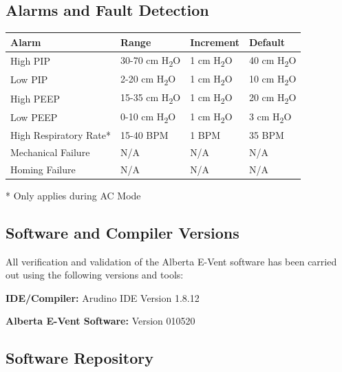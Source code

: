 \documentclass[]{article}
\begin{document}
\subsection{Alarms and Fault Detection}

\begin{center}
	
	\begin{table}[h]
		

	\begin{tabular}{ |p{4.3cm}| p{3cm}| p{3cm}|p{3cm}|}
		\hline
		\textbf{Alarm} & \textbf{Range} & \textbf{Increment} & \textbf{Default}\\
		\hline
		High PIP & 30-70 cm H\textsubscript{2}O & 1 cm H\textsubscript{2}O & 40 cm H\textsubscript{2}O\\
		\hline
		Low PIP & 2-20 cm H\textsubscript{2}O & 1 cm H\textsubscript{2}O & 10 cm H\textsubscript{2}O\\
		\hline
		High PEEP & 15-35 cm H\textsubscript{2}O & 1 cm H\textsubscript{2}O &  20 cm H\textsubscript{2}O\\
		\hline
		Low PEEP & 0-10 cm H\textsubscript{2}O & 1 cm H\textsubscript{2}O &  3 cm H\textsubscript{2}O\\
		\hline
		High Respiratory Rate* & 15-40 BPM & 1 BPM & 35 BPM\\
		\hline
		Mechanical Failure & N/A & N/A & N/A\\
		\hline
		Homing Failure & N/A & N/A & N/A \\
		\hline
	\end{tabular}

* Only applies during AC Mode

	\end{table}
	
\end{center}



\subsection{Software and Compiler Versions}

All verification and validation of the Alberta E-Vent software has been carried out using the following versions and tools:
\bigskip

\noindent\textbf{IDE/Compiler:} Arudino IDE Version 1.8.12

\noindent\textbf{Alberta E-Vent Software:} Version 010520

\subsection{Software Repository}
\end{document}
